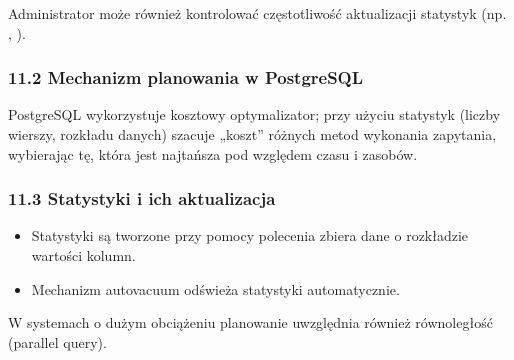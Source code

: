 \documentclass[letterpaper,10pt,polish]{sphinxmanual}
\begin{document}
\sphinxAtStartPar
Administrator może również kontrolować częstotliwość aktualizacji statystyk (np. , ).


\subsubsection{11.2 Mechanizm planowania w PostgreSQL}
\label{\detokenize{rozdzial2/Konfiguracja_baz_danych/Konfiguracja_baz_danych:mechanizm-planowania-w-postgresql}}
\sphinxAtStartPar
PostgreSQL wykorzystuje kosztowy optymalizator; przy użyciu statystyk (liczby wierszy, rozkładu danych) szacuje „koszt” różnych metod wykonania zapytania, wybierając tę, która jest najtańsza pod względem czasu i zasobów.


\subsubsection{11.3 Statystyki i ich aktualizacja}
\label{\detokenize{rozdzial2/Konfiguracja_baz_danych/Konfiguracja_baz_danych:statystyki-i-ich-aktualizacja}}\begin{itemize}
\item {} 
\sphinxAtStartPar
Statystyki są tworzone przy pomocy polecenia  \textendash{} zbiera dane o rozkładzie wartości kolumn.

\item {} 
\sphinxAtStartPar
Mechanizm autovacuum odświeża statystyki automatycznie.

\end{itemize}

\sphinxAtStartPar
{}

\begin{sphinxVerbatim}[commandchars=\\\{\}]
 \PYG{p}{[}\PYG{p}{]}
\end{sphinxVerbatim}

\sphinxAtStartPar
W systemach o dużym obciążeniu planowanie uwzględnia również równoległość (parallel query).
\end{document}
